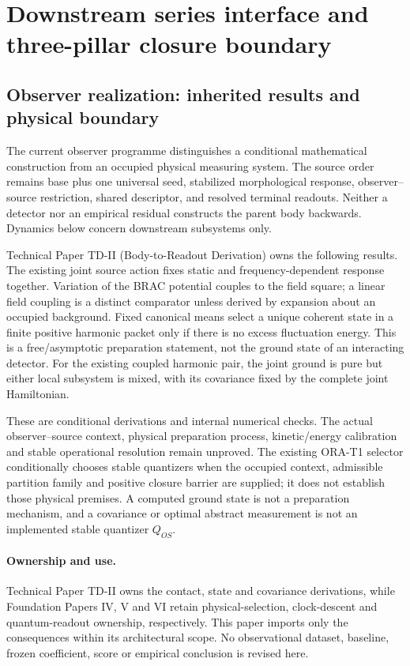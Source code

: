 \documentclass[11pt]{article}
\begin{document}
\section{Downstream series interface and three-pillar closure boundary}
\label{sec:downstream-series-interface}

\subsection{Observer realization: inherited results and physical boundary}
\label{sec:observer-update-20260914}
The current observer programme distinguishes a conditional mathematical
construction from an occupied physical measuring system. The source order
remains base plus one universal seed, stabilized morphological response,
observer--source restriction, shared descriptor, and resolved terminal
readouts. Neither a detector nor an empirical residual constructs the parent
body backwards. Dynamics below concern downstream subsystems only.

Technical Paper TD-II (Body-to-Readout Derivation) owns the following
results. The existing joint source action fixes static and frequency-dependent
response together. Variation of the BRAC potential couples to the field
square; a linear field coupling is a distinct comparator unless derived by
expansion about an occupied background. Fixed canonical means select a unique
coherent state in a finite positive harmonic packet only if there is no excess
fluctuation energy. This is a free/asymptotic preparation statement, not the
ground state of an interacting detector. For the existing coupled harmonic
pair, the joint ground is pure but either local subsystem is mixed, with its
covariance fixed by the complete joint Hamiltonian.

These are conditional derivations and internal numerical checks. The actual
observer--source context, physical preparation process, kinetic/energy
calibration and stable operational resolution remain unproved. The existing
ORA-T1 selector conditionally chooses stable quantizers when the occupied
context, admissible partition family and positive closure barrier are supplied;
it does not establish those physical premises. A computed ground state is not
a preparation mechanism, and a covariance or optimal abstract measurement is
not an implemented stable quantizer $Q_{OS}$.

\paragraph{Ownership and use.}
Technical Paper TD-II owns the contact, state and covariance derivations, while
Foundation Papers IV, V and VI retain physical-selection, clock-descent and
quantum-readout ownership, respectively. This paper imports only the
consequences within its architectural scope. No observational dataset, baseline,
frozen coefficient, score or empirical conclusion is revised here.
\end{document}
